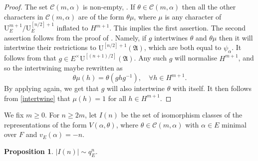 \documentclass[JEP,XML,SOM,Unicode,NoEqCountersInSection]{cedram}
\let\mathcal\mathscr
\newtheorem{prop}{Proposition}[section]
\theoremstyle{definition}
\newcommand{\Aa}{\mathfrak A}
\newcommand{\UU}{\mathrm U}
\begin{document}
\begin{proof} The set $\mathcal C(m, \alpha)$ is non-empty, \cite[(3.3.18)]{BK}. If $\theta\in \mathcal C(m, \alpha)$ then all the other characters
in $\mathcal C(m, \alpha)$ are of the form $\theta \mu$, where $\mu$ is any character of $\UU^{m+1}_E/ \UU^{[n/2]+1}_E$ inflated to $H^{m+1}$.
This implies the first assertion. The second assertion follows from the proof of \cite[Prop.\,7.3]{thesis}.
Namely, if $g$ intertwines $\theta$ and $\theta \mu$ then it will intertwine their restrictions to $\UU^{[n/2]+1}(\Aa)$, which are both equal to
$\psi_{\alpha}$. It follows from \cite[(3.3.2)]{BK} that $g\in E^{\times} \UU^{[(n+1)/2]}(\Aa)$. Any such $g$ will normalise $H^{m+1}$, and so
the intertwining maybe rewritten as
\begin{equation}\label{intertwine}
\theta\mu(h)= \theta(g h g^{-1}), \quad \forall h \in H^{m+1}.
\end{equation}
By applying \cite[(3.3.2)]{BK} again, we get that $g$ will also intertwine $\theta$ with itself. It then follows from \eqref{intertwine} that $\mu(h)=1$
for all $h\in H^{m+1}$.
\end{proof}

We fix $m\ge 0$. For $n\ge 2m$, let $I(n)$ be the set of isomorphism classes of the representations of the form $V(\alpha, \theta)$, where
$\theta\in \mathcal C(m, \alpha)$ with $\alpha\in E$ minimal over $F$ and $v_E(\alpha)=-n$.

\begin{prop}\label{size_I(n)} $|I(n)|\sim q_E^{n}$.
\end{prop}
\end{document}
